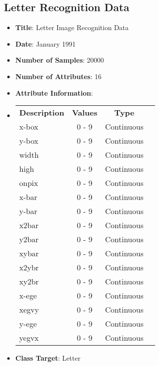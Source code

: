 \documentclass[11pt,titlepage]{article}
\newcommand{\bb}{\textbf}
\begin{document}
\subsection{Letter Recognition Data}
\begin{itemize}[leftmargin=*]
  \item[] \bb{Title}: Letter Image Recognition Data
  \item[] \bb{Date}: January 1991
  \item[] \bb{Number of Samples}: 20000
  \item[] \bb{Number of Attributes}: 16
  \item[] \bb{Attribute Information}:
  \item[]
  \begin{tabular}{l c c c }
    \bb{Description} & \bb{Values}            & \bb{Type}  \\
    x-box	           & 0 - 9                  & Continuous \\
    y-box	           & 0 - 9                  & Continuous \\
    width	           & 0 - 9                  & Continuous \\
    high 	           & 0 - 9                  & Continuous \\
    onpix	           & 0 - 9                  & Continuous \\
    x-bar	           & 0 - 9                  & Continuous \\
    y-bar	           & 0 - 9                  & Continuous \\
    x2bar	           & 0 - 9                  & Continuous \\
    y2bar	           & 0 - 9                  & Continuous \\
    xybar	           & 0 - 9                  & Continuous \\
    x2ybr	           & 0 - 9                  & Continuous \\
    xy2br	           & 0 - 9                  & Continuous \\
    x-ege	           & 0 - 9                  & Continuous \\
    xegvy	           & 0 - 9                  & Continuous \\
    y-ege	           & 0 - 9                  & Continuous \\
    yegvx	           & 0 - 9                  & Continuous
  \end{tabular}
  \item[] \bb{Class Target}: Letter

\end{itemize}
\end{document}
